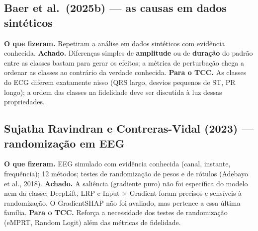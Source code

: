 \documentclass[11pt,a4paper]{article}
\begin{document}
\subsection{Baer et al.\ (2025b) — as causas em dados sintéticos}
\textbf{O que fizeram.} Repetiram a análise em dados sintéticos com evidência conhecida. \textbf{Achado.} Diferenças simples de \textbf{amplitude} ou de \textbf{duração} do padrão entre as classes bastam para gerar os efeitos; a métrica de perturbação chega a ordenar as classes ao contrário da verdade conhecida. \textbf{Para o TCC.} As classes do ECG diferem exatamente nisso (QRS largo, desvios pequenos de ST, PR longo); a ordem das classes na fidelidade deve ser discutida à luz dessas propriedades.

\subsection{Sujatha Ravindran e Contreras-Vidal (2023) — randomização em EEG}
\textbf{O que fizeram.} EEG simulado com evidência conhecida (canal, instante, frequência); 12 métodos; testes de randomização de pesos e de rótulos (Adebayo et al., 2018). \textbf{Achado.} A saliência (gradiente puro) não foi específica do modelo nem da classe; DeepLift, LRP e Input × Gradient foram precisos e sensíveis à randomização. O GradientSHAP não foi avaliado, mas pertence a essa última família. \textbf{Para o TCC.} Reforça a necessidade dos testes de randomização (eMPRT, Random Logit) além das métricas de fidelidade.
\end{document}
